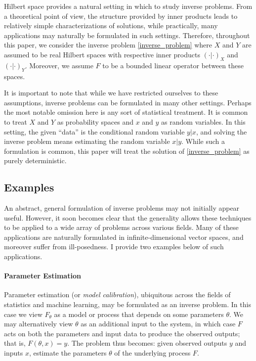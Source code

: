 \documentclass[12pt]{article}
\begin{document}
Hilbert space provides a natural setting in which to study inverse problems. From a theoretical point of view, the structure provided by 
inner products leads to relatively simple characterizations of solutions, while practically, many applications may 
naturally be formulated in such settings. Therefore, throughout this paper, we consider the inverse problem \eqref{inverse_problem}
where $X$ and $Y$ are assumed to be real Hilbert spaces with respective inner products $(\cdot | \cdot)_X$ and $(\cdot | \cdot)_Y$. 
Moreover, we assume $F$ to be a bounded linear operator between these spaces. 

It is important to note that while we have restricted ourselves to these assumptions, inverse problems can be formulated in many 
other settings. Perhaps the most notable omission here is any sort of statistical treatment. It is common to treat $X$ and $Y$ as
probability spaces and $x$ and $y$ as random variables. In this setting, the given ``data'' is the conditional random variable 
$y|x$, and solving the inverse problem means estimating the random variable $x|y$. While such a formulation is common, this 
paper will treat the solution of \eqref{inverse_problem} as purely deterministic.  

 \subsection{Examples}
 
 An abstract, general formulation of inverse problems may not initially appear useful. 
 However, it soon becomes clear that the generality allows these techniques to be 
 applied to a wide array of problems across various fields. Many of these applications 
 are naturally formulated in infinite-dimensional vector spaces, and moreover suffer from
  ill-posedness. I provide two examples below of such applications. 
 
 \paragraph*{Parameter Estimation}
 Parameter estimation (or \textit{model calibration}), ubiquitous across the fields of statistics 
 and machine learning, may be formulated as an inverse problem. In this case we view 
 $F_\theta$ as a model or process that depends on some parameters $\theta$. We may
  alternatively view $\theta$ as an additional input to the system, in which case $F$ acts 
  on both the parameters and input data to produce the observed outputs; that is, 
  $F(\theta, x) = y$. The problem thus becomes: given observed outputs $y$ and inputs $x$, 
  estimate the parameters $\theta$ of the underlying process $F$. 
  
\end{document}
